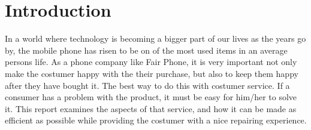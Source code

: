 \documentclass[final]{scrreprt} %
\begin{document}
\chapter{Introduction}
In a world where technology is becoming a bigger part of our lives as the years go by, the mobile phone has risen to be on of the most used items in an average persons life. As a phone company like Fair Phone, it is very important not only make the costumer happy with the their purchase, but also to keep them happy after they have bought it. The best way to do this with costumer service. If a consumer has a problem with the product, it must be easy for him/her to solve it. This report examines the aspects of that service, and how it can be made as efficient as possible while providing the costumer with a nice repairing experience.
\end{document}
